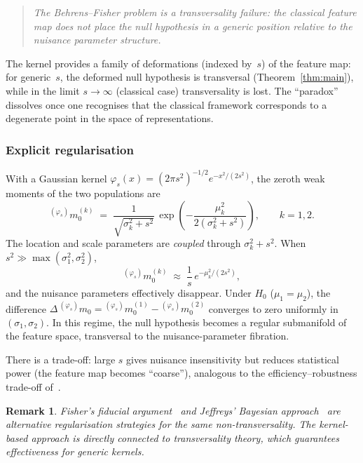\documentclass[11pt,a4paper]{article}
\newtheorem{remark}[theorem]{Remark}
\begin{document}
\begin{quote}
\emph{The Behrens--Fisher problem is a transversality failure: the
classical feature map does not place the null hypothesis in a generic
position relative to the nuisance parameter structure.}
\end{quote}

The kernel provides a family of deformations (indexed by~$s$) of the
feature map: for generic~$s$, the deformed null hypothesis is
transversal (Theorem~\ref{thm:main}), while in the limit
$s\to\infty$ (classical case) transversality is lost.  The
``paradox'' dissolves once one recognises that the classical framework
corresponds to a degenerate point in the space of representations.

\subsubsection{Explicit regularisation}

With a Gaussian kernel $\varphi_s(x) = (2\pi s^2)^{-1/2}
e^{-x^2/(2s^2)}$, the zeroth weak moments of the two populations are
\begin{equation}\label{eq:bf_w0}
  {}^{(\varphi_s)}m_0^{(k)}
  \;=\;
  \frac{1}{\sqrt{\sigma_k^2 + s^2}}\,
  \exp\!\left(-\frac{\mu_k^2}{2(\sigma_k^2+s^2)}\right),
  \qquad k=1,2.
\end{equation}
The location and scale parameters are \emph{coupled} through
$\sigma_k^2+s^2$.  When $s^2\gg\max(\sigma_1^2,\sigma_2^2)$,
\[
  {}^{(\varphi_s)}m_0^{(k)}
  \;\approx\;
  \frac{1}{s}\,e^{-\mu_k^2/(2s^2)},
\]
and the nuisance parameters effectively disappear.  Under $H_0$
($\mu_1=\mu_2$), the difference
$\Delta\,{}^{(\varphi_s)}m_0 = {}^{(\varphi_s)}m_0^{(1)} - {}^{(\varphi_s)}m_0^{(2)}$
converges to zero uniformly in $(\sigma_1,\sigma_2)$.  In this
regime, the null hypothesis becomes a regular submanifold of the
feature space, transversal to the nuisance-parameter fibration.

There is a trade-off: large $s$ gives nuisance insensitivity but
reduces statistical power (the feature map becomes ``coarse''),
analogous to the efficiency--robustness trade-off of~\cite{B}.

\begin{remark}
Fisher's fiducial argument~\cite{Fisher1935} and Jeffreys' Bayesian
approach~\cite{Jeffreys1961} are alternative regularisation strategies
for the same non-transversality.  The kernel-based approach is
directly connected to transversality theory, which guarantees
effectiveness for generic kernels.
\end{remark}
\end{document}
